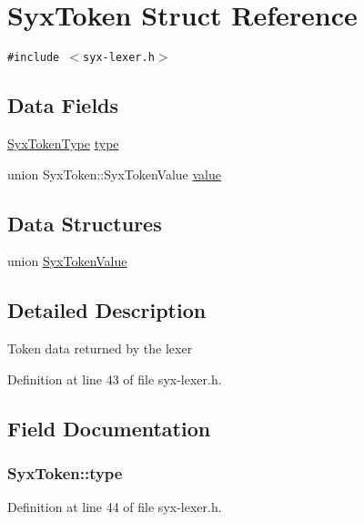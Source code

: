 \hypertarget{struct_syx_token}{
\section{SyxToken Struct Reference}
\label{struct_syx_token}
}
{\tt \#include $<$syx-lexer.h$>$}

\subsection*{Data Fields}
\begin{CompactItemize}
\item 
\hyperlink{syx-enums_8h_07b7e5545aac6b353ad9df2846fd96a9}{SyxTokenType} \hyperlink{struct_syx_token_14d3e8e7f62702363005bd355fbf08d3}{type}
\item 
union SyxToken::SyxTokenValue \hyperlink{struct_syx_token_9f8db78333f031cc628495af76ae9388}{value}
\end{CompactItemize}
\subsection*{Data Structures}
\begin{CompactItemize}
\item 
union \hyperlink{union_syx_token_1_1_syx_token_value}{SyxTokenValue}
\end{CompactItemize}


\subsection{Detailed Description}
Token data returned by the lexer 

Definition at line 43 of file syx-lexer.h.

\subsection{Field Documentation}
\hypertarget{struct_syx_token_14d3e8e7f62702363005bd355fbf08d3}{
\subsubsection{ {\bf SyxToken::type}}}
\label{struct_syx_token_14d3e8e7f62702363005bd355fbf08d3}




Definition at line 44 of file syx-lexer.h.

